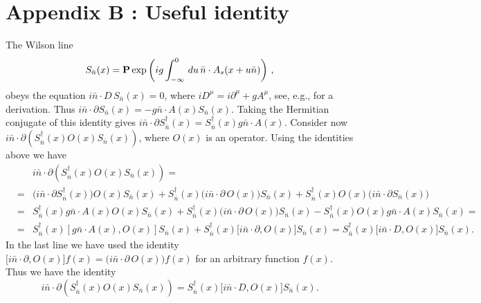 \section{Appendix B : Useful identity}\label{appen_b}
The  Wilson line 
\begin{equation}
S_{\bar n}(x)=\mbox{\bf P}\exp \left( ig\int_{-\infty}^0 \,du \,\bar n\cdot A_s(x+u\bar n) \right)\,,
\end{equation}
obeys the equation $i\bar n\cdot D\,S_{\bar n}(x)=0$, where $iD^\mu=i\partial^\mu+gA^\mu$, see, e.g., \cite{Becher:2014oda} for a derivation.  Thus $i\bar n\cdot\partial S_{\bar n}(x)=-g\bar n\cdot A(x)S_{\bar n}(x)$. Taking the Hermitian conjugate of this identity gives $i\bar n\cdot\partial S^\dagger_{\bar n}(x)=S^\dagger_{\bar n}(x)g\bar n\cdot A(x)$. Consider now $i\bar n\cdot \partial \left(S_{\bar n}^\dagger(x) O(x) S_{\bar n}(x) \right)$, where $O(x)$ is an operator. Using the identities above we have 
\begin{eqnarray}
&&i\bar n\cdot \partial \left(S_{\bar n}^\dagger(x) O(x) S_{\bar n}(x) \right)=\nonumber\\
&=&\big(i\bar n\cdot \partial S_{\bar n}^\dagger(x)\big)O(x) S_{\bar n}(x) +S_{\bar n}^\dagger(x)\big(i\bar n\cdot \partial\, O(x)\big)S_{\bar n}(x) +S_{\bar n}^\dagger(x)O(x) \big(i\bar n\cdot \partial S_{\bar n}(x) \big)\nonumber\\
&=&S^\dagger_{\bar n}(x)g\bar n\cdot A(x)O(x) S_{\bar n}(x) +S_{\bar n}^\dagger(x)\big(i\bar n\cdot \partial\, O(x)\big)S_{\bar n}(x)-S_{\bar n}^\dagger(x) O(x) g\bar n\cdot A(x)S_{\bar n}(x)=\nonumber\\
&=& S^\dagger_{\bar n}(x)[g\bar n\cdot A(x),O(x)] S_{\bar n}(x)+S_{\bar n}^\dagger(x)\big[i\bar n\cdot \partial ,O(x)\big]S_{\bar n}(x)=S_{\bar n}^\dagger(x)\big[i\bar n\cdot D,O(x)\big]S_{\bar n}(x).
\end{eqnarray}
In the last line we have used the identity $\big[i\bar n\cdot \partial ,O(x)\big]f(x)=\big(i\bar n\cdot \partial\, O(x)\big)f(x)$ for an arbitrary function $f(x)$. Thus we have the identity 
 \begin{equation}
 i\bar n\cdot \partial \left(S_{\bar n}^\dagger(x) O(x) S_{\bar n}(x) \right)=S_{\bar n}^\dagger(x)\big[i\bar n\cdot D,O(x)\big]S_{\bar n}(x).
 \end{equation}
